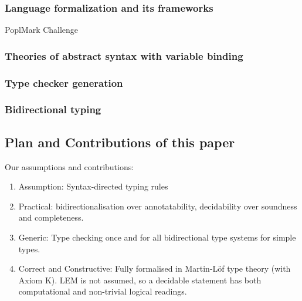 \documentclass[acmsmall,screen]{acmart}
\theoremstyle{acmdefinition}
\begin{document}
\citep{Xie2018}
\subsubsection{Language formalization and its frameworks}
\cite{Wadler2022}
PoplMark Challenge~\citep{Aydemir2005}

\cite{Cimini2020,Cimini2022}

\citep{Ahrens2018,Fiore2022,Gheri2020,Ahrens2022}
\cite{Allais2021}

\subsubsection{Theories of abstract syntax with variable binding}
\cite{Fiore1999,Hirschowitz2010,Ahrens2018,Fiore2022,Ahrens2021,Arkor2020,Hirschowitz2022}
\cite{Fiore2013,Hamana2011,Hamana2022}


\subsubsection{Type checker generation}
\cite{Gast2004,Grewe2015,Pacak2020,Cimini2020}

\subsubsection{Bidirectional typing}

\cite{Pierce2000}
\cite{Dunfield2021}


\subsection{Plan and Contributions of this paper}

Our assumptions and contributions:
\begin{enumerate}
  \item Assumption: Syntax-directed typing rules
  \item Practical: bidirectionalisation over annotatability, decidability over soundness and completeness.
  \item Generic: Type checking once and for all bidirectional type systems for simple types.
  \item Correct and Constructive: Fully formalised in Martin-Löf type theory (with Axiom K).
    LEM is not assumed, so a decidable statement has both computational and non-trivial logical readings.
\end{enumerate}
\end{document}
